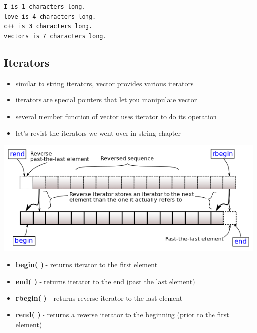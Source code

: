 \documentclass[11pt]{article}
\providecommand{\tightlist}{%
      \setlength{\itemsep}{0pt}\setlength{\parskip}{0pt}}
\begin{document}
    \begin{Verbatim}[commandchars=\\\{\}]
I is 1 characters long.
love is 4 characters long.
c++ is 3 characters long.
vectors is 7 characters long.
    \end{Verbatim}

    \hypertarget{iterators}{%
\subsection{Iterators}\label{iterators}}

\begin{itemize}
\tightlist
\item
  similar to string iterators, vector provides various iterators
\item
  iterators are special pointers that let you manipulate vector
\item
  several member function of vector uses iterator to do its operation
\item
  let's revist the iterators we went over in string chapter
\end{itemize}

\includegraphics{resources/range-rbegin-rend.png}

\begin{itemize}
\tightlist
\item
  \textbf{begin( )} - returns iterator to the first element
\item
  \textbf{end( )} - returns iterator to the end (past the last element)
\item
  \textbf{rbegin( )} - returns reverse iterator to the last element
\item
  \textbf{rend( )} - returns a reverse iterator to the beginning (prior
  to the first element)
\end{itemize}
\end{document}

